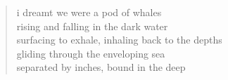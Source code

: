 
\begin{verse}
i dreamt we were a pod of whales \\
rising and falling in the dark water \\
surfacing to exhale, inhaling back to the depths \\
gliding through the enveloping sea \\
separated by inches, bound in the deep
\end{verse}
